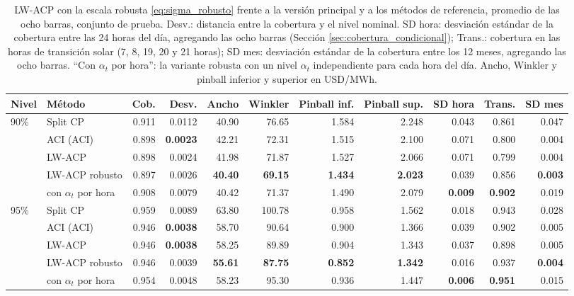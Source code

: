 \begin{table}[htbp]
    \centering
    \footnotesize
    \setlength{\tabcolsep}{2pt}
    \begin{tabular}{llrrrrrrrrr}
        \toprule
        Nivel & Método & Cob. & Desv. & Ancho & Winkler & Pinball inf. & Pinball sup. & SD hora & Trans. & SD mes \\
        \midrule
        \multirow{5}{*}{90\%}
            & Split CP             & 0.911 & 0.0112 & 40.90 & 76.65 & 1.584 & 2.248 & 0.043 & 0.861 & 0.047 \\
            & ACI (ACI)            & 0.898 & \textbf{0.0023} & 42.21 & 72.31 & 1.515 & 2.100 & 0.071 & 0.800 & 0.004 \\
            & LW-ACP               & 0.898 & 0.0024 & 41.98 & 71.87 & 1.527 & 2.066 & 0.071 & 0.799 & 0.004 \\
            & LW-ACP robusto       & 0.897 & 0.0026 & \textbf{40.40} & \textbf{69.15} & \textbf{1.434} & \textbf{2.023} & 0.039 & 0.856 & \textbf{0.003} \\
            & \quad con $\alpha_t$ por hora & 0.908 & 0.0079 & 40.42 & 71.37 & 1.490 & 2.079 & \textbf{0.009} & \textbf{0.902} & 0.019 \\
        \midrule
        \multirow{5}{*}{95\%}
            & Split CP             & 0.959 & 0.0089 & 63.80 & 100.78 & 0.958 & 1.562 & 0.018 & 0.943 & 0.028 \\
            & ACI (ACI)            & 0.946 & \textbf{0.0038} & 58.70 & 90.64 & 0.900 & 1.366 & 0.039 & 0.902 & 0.005 \\
            & LW-ACP               & 0.946 & \textbf{0.0038} & 58.25 & 89.89 & 0.904 & 1.343 & 0.037 & 0.898 & 0.005 \\
            & LW-ACP robusto       & 0.946 & 0.0039 & \textbf{55.61} & \textbf{87.75} & \textbf{0.852} & \textbf{1.342} & 0.016 & 0.937 & \textbf{0.004} \\
            & \quad con $\alpha_t$ por hora & 0.954 & 0.0048 & 58.23 & 95.30 & 0.936 & 1.447 & \textbf{0.006} & \textbf{0.951} & 0.015 \\
        \bottomrule
    \end{tabular}
    \vspace{0.2cm}
    \caption{LW-ACP con la escala robusta \eqref{eq:sigma_robusto} frente a la versión principal y a los métodos de referencia, promedio de las ocho barras, conjunto de prueba. Desv.: distancia entre la cobertura y el nivel nominal. SD hora: desviación estándar de la cobertura entre las 24 horas del día, agregando las ocho barras (Sección \ref{sec:cobertura_condicional}); Trans.: cobertura en las horas de transición solar (7, 8, 19, 20 y 21 horas); SD mes: desviación estándar de la cobertura entre los 12 meses, agregando las ocho barras. ``Con $\alpha_t$ por hora'': la variante robusta con un nivel $\alpha_t$ independiente para cada hora del día. Ancho, Winkler y pinball inferior y superior en USD/MWh.}
    \label{tab:lwacp_robusto}
\end{table}

